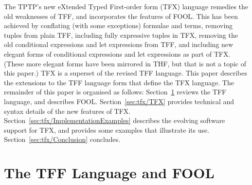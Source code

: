 The TPTP's new eXtended Typed First-order form (TFX) language remedies the
old weaknesses of TFF, and incorporates the features of FOOL.
This has been achieved by conflating (with some exceptions) formulae and 
terms, removing tuples from plain TFF, including fully expressive tuples in 
TFX, removing the old conditional expressions and let expressions from 
TFF, and including new elegant forms of conditional expressions and let 
expressions as part of TFX. 
(These more elegant forms have been mirrored in THF, but that is not a topic of
this paper.)
TFX is a superset of the revised TFF language. 
This paper describes the extensions to the TFF language form that define the 
TFX language.
The remainder of this paper is organised as follows:
Section~\ref{sec:tfx/TPTPFOOL} reviews the TFF language, and describes FOOL.
Section~\ref{sec:tfx/TFX} provides technical and syntax details of the new features 
of TFX.
Section~\ref{sec:tfx/ImplementationExamples} describes the evolving software 
support for TFX, and provides some examples that illustrate its use.
Section~\ref{sec:tfx/Conclusion} concludes.

\section{The TFF Language and FOOL}
\label{sec:tfx/TPTPFOOL}


